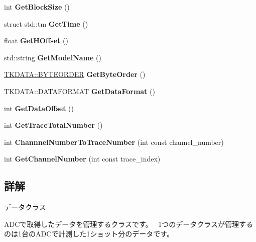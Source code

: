 \begin{DoxyCompactItemize}
int {\bfseries Get\+Block\+Size} ()
\item 
\mbox{\label{class_t_k_d_a_t_a_a92cf4028c059bd418905006275b8c727}} 
struct std\+::tm {\bfseries Get\+Time} ()
\item 
\mbox{\label{class_t_k_d_a_t_a_ac823854fcfb02d7788ec491b38f4d615}} 
float {\bfseries Get\+H\+Offset} ()
\item 
\mbox{\label{class_t_k_d_a_t_a_af0a676448ec4d492290517a7e60a2de3}} 
std\+::string {\bfseries Get\+Model\+Name} ()
\item 
\mbox{\label{class_t_k_d_a_t_a_a63437cd1b2448b0b54ee6ec56da1321e}} 
\hyperlink{class_t_k_d_a_t_a_ab55f2c2d1c76bbeb3c1820ad2e749f38}{T\+K\+D\+A\+T\+A\+::\+B\+Y\+T\+E\+O\+R\+D\+ER} {\bfseries Get\+Byte\+Order} ()
\item 
\mbox{\label{class_t_k_d_a_t_a_a86117b4edecbf2e3013973fb016877e2}} 
T\+K\+D\+A\+T\+A\+::\+D\+A\+T\+A\+F\+O\+R\+M\+AT {\bfseries Get\+Data\+Format} ()
\item 
\mbox{\label{class_t_k_d_a_t_a_a11fad512e15a5b8dd7be2ff786d5fd8e}} 
int {\bfseries Get\+Data\+Offset} ()
\item 
\mbox{\label{class_t_k_d_a_t_a_a0e9270376ed47917048fdd38f2f4a81d}} 
int {\bfseries Get\+Trace\+Total\+Number} ()
\item 
\mbox{\label{class_t_k_d_a_t_a_ad70108b9612759566d7cc90e60f293c5}} 
int {\bfseries Channnel\+Number\+To\+Trace\+Number} (int const channel\+\_\+number)
\item 
\mbox{\label{class_t_k_d_a_t_a_a8282e57fcee3618dfe533b6771adce96}} 
int {\bfseries Get\+Channel\+Number} (int const trace\+\_\+index)
\end{DoxyCompactItemize}


\subsection{詳解}
データクラス

A\+D\+Cで取得したデータを管理するクラスです。~\newline
 1つのデータクラスが管理するのは1台の\+A\+D\+Cで計測した1ショット分のデータです。 

